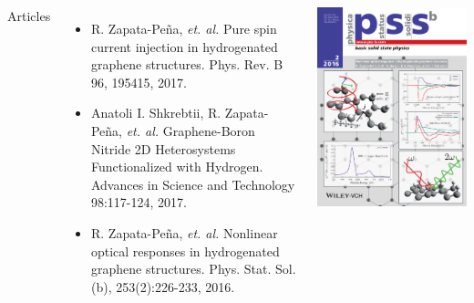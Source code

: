 \documentclass{beamer}
\begin{document}

\begin{frame}
    
\begin{columns}


{\Large Articles}

{\small
\begin{itemize}

\vspace{-2mm}
\item 
R. Zapata-Pe\~na, \emph{et. al.} Pure spin current injection in hydrogenated
   graphene structures. Phys. Rev. B 96, 195415, 2017.

\vspace{-2mm}
\item 
Anatoli I. Shkrebtii, R. Zapata-Pe\~na, \emph{et. al.} Graphene-Boron Nitride
   2D Heterosystems Functionalized with Hydrogen. Advances in Science and
   Technology 98:117-124, 2017.

\vspace{-2mm}
\item 
R. Zapata-Pe\~na, \emph{et. al.} Nonlinear optical responses in hydrogenated
   graphene structures. Phys. Stat. Sol. (b), 253(2):226-233, 2016.

\end{itemize}

}


\includegraphics[width=1.0\textwidth]{figs/cover.pdf}


\end{columns}
\end{frame}
\end{document}
